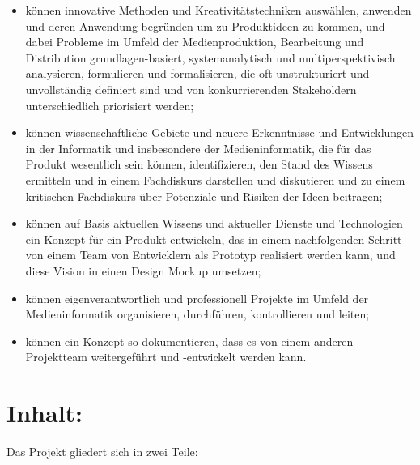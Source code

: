 \begin{itemize}
\tightlist
\item
  können innovative Methoden und Kreativitätstechniken auswählen,
  anwenden und deren Anwendung begründen um zu Produktideen zu kommen,
  und dabei Probleme im Umfeld der Medienproduktion, Bearbeitung und
  Distribution grundlagen-basiert, systemanalytisch und
  multiperspektivisch analysieren, formulieren und formalisieren, die
  oft unstrukturiert und unvollständig definiert sind und von
  konkurrierenden Stakeholdern unterschiedlich priorisiert werden;
\item
  können wissenschaftliche Gebiete und neuere Erkenntnisse und
  Entwicklungen in der Informatik und insbesondere der Medieninformatik,
  die für das Produkt wesentlich sein können, identifizieren, den Stand
  des Wissens ermitteln und in einem Fachdiskurs darstellen und
  diskutieren und zu einem kritischen Fachdiskurs über Potenziale und
  Risiken der Ideen beitragen;
\item
  können auf Basis aktuellen Wissens und aktueller Dienste und
  Technologien ein Konzept für ein Produkt entwickeln, das in einem
  nachfolgenden Schritt von einem Team von Entwicklern als Prototyp
  realisiert werden kann, und diese Vision in einen Design Mockup
  umsetzen;
\item
  können eigenverantwortlich und professionell Projekte im Umfeld der
  Medieninformatik organisieren, durchführen, kontrollieren und leiten;
\item
  können ein Konzept so dokumentieren, dass es von einem anderen
  Projektteam weitergeführt und -entwickelt werden kann.
\end{itemize}

\section*{Inhalt:\label{/mi-2017/modulbeschreibungen-master/MA_Modul_Projekt_Vision&Konzept}}\label{inhaltpathlabelmi-2017modulbeschreibungen-mastermaux5fmodulux5fprojektux5fvisionkonzept}

Das Projekt gliedert sich in zwei Teile:

